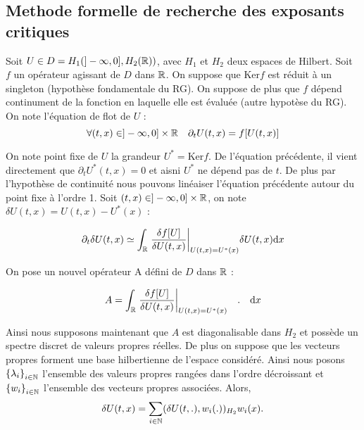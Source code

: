 \documentclass[10pt]{article}
\begin{document}
\begin{multicols}{2}

\section{Methode formelle de recherche des exposants critiques}

Soit $U \in D = H_1(]-\infty, 0], H_2(\mathbb{R}))$, avec $H_1$ et $H_2$ deux espaces de Hilbert. Soit $f$ un opérateur agissant de $D$ dans $\mathbb{R}$. On suppose que $\text{Ker}f$ est réduit à un singleton (hypothèse fondamentale du RG). On suppose de plus que $f$ dépend continument de la fonction en laquelle elle est évaluée (autre hypotèse du RG). On note l'équation de flot de $U$ :
\begin{equation}
  \forall (t, x) \in ]-\infty, 0]\times\mathbb{R} \quad \partial_t U(t,x) = f[U(t, x)]
\end{equation}

On note point fixe de $U$ la grandeur $U^*=\text{Ker}f$. De l'équation précédente, il vient directement que $\partial_t U^*(t, x) = 0$ et aisni $U^*$ ne dépend pas de $t$. De plus par l'hypothèse de continuité nous pouvons linéaiser l'équation précédente autour du point fixe à l'ordre 1. Soit $(t, x) \in ]-\infty, 0]\times\mathbb{R}$, on note $\delta U(t,x) = U(t,x) - U^*(x)$ : 

\begin{equation}
  \partial_t \delta U(t,x) \simeq \int_{\mathbb{R}} {\left. \frac{\delta f[U]}{\delta U(t,x)} \right|}_{U(t,x) = U^*(x)}  \delta U(t, x) \text{d} x 
\end{equation}

On pose un nouvel opérateur A défini de $D$ dans $\mathbb{R}$ : 

\begin{equation}
  A = \int_{\mathbb{R}} {\left. \frac{\delta f[U]}{\delta U(t,x)} \right|}_{U(t,x) = U^*(x)} \quad . \quad \text{d} x
\end{equation} 

Ainsi nous supposons maintenant que $A$ est diagonalisable dans $H_2$ et possède un spectre discret de valeurs propres réelles. De plus on suppose que les vecteurs propres forment une base hilbertienne de l'espace considéré. Ainsi nous posons $\left\{ \lambda_i\right\}_{i\in\mathbb{N}}$ l'ensemble des valeurs propres rangées dans l'ordre décroissant et $\left\{ w_i\right\}_{i\in\mathbb{N}}$ l'ensemble des vecteurs propres associées. Alors, 
\begin{equation}
  \delta U(t,x) = \sum_{i\in\mathbb{N}} (\delta U(t, .),  w_i(.))_{H_2} w_i(x).
\end{equation}


\end{multicols}
\end{document}
